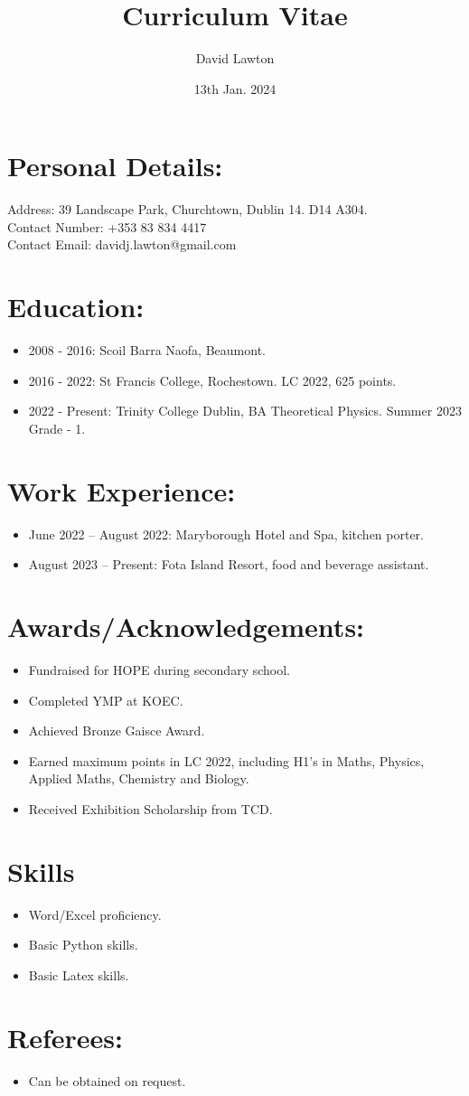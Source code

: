 \documentclass{article}
\title{Curriculum Vitae}
\author{David Lawton}
\date{13th Jan. 2024}
\begin{document}
\maketitle
\vfill
\newpage
\section{Personal Details:}
Address: 39 Landscape Park, Churchtown, Dublin 14. D14 A304.\\
Contact Number: +353 83 834 4417\\
Contact Email: davidj.lawton@gmail.com\\

\section{Education:}
\begin{itemize}
\item 2008 - 2016: Scoil Barra Naofa, Beaumont.
\item 2016 - 2022: St Francis College, Rochestown. LC 2022, 625 points.
\item 2022 - Present: Trinity College Dublin, BA Theoretical Physics. Summer 2023 Grade - 1.
\end{itemize}
\section{Work Experience:}
\begin{itemize}
\item June 2022 – August 2022: Maryborough Hotel and Spa, kitchen porter. 
\item August 2023 – Present: Fota Island Resort, food and beverage assistant.
\end{itemize}
\section{Awards/Acknowledgements:}
\begin{itemize}
\item Fundraised for HOPE during secondary school.
\item Completed YMP at KOEC.
\item Achieved Bronze Gaisce Award.
\item Earned maximum points in LC 2022, including H1's in Maths, Physics, Applied Maths, Chemistry and Biology.
\item Received Exhibition Scholarship from TCD.
\end{itemize}
\section{Skills}
\begin{itemize}
\item Word/Excel proficiency.
\item Basic Python skills.
\item Basic Latex skills.
\end{itemize}
\section{Referees:}
\begin{itemize}
\item Can be obtained on request.
\end{itemize}
\end{document}
